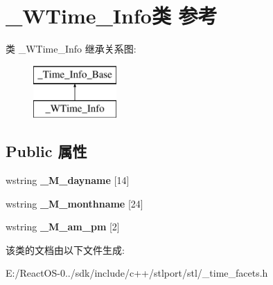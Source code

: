 \hypertarget{class___w_time___info}{}\section{\+\_\+\+W\+Time\+\_\+\+Info类 参考}
\label{class___w_time___info}
类 \+\_\+\+W\+Time\+\_\+\+Info 继承关系图\+:\begin{figure}[H]
\begin{center}
\leavevmode
\includegraphics[height=2.000000cm]{class___w_time___info}
\end{center}
\end{figure}
\subsection*{Public 属性}
\begin{DoxyCompactItemize}
\item 
\mbox{\label{class___w_time___info_a647f1048353a46c41dee81b80a72613f}} 
wstring {\bfseries \+\_\+\+M\+\_\+dayname} \mbox{[}14\mbox{]}
\item 
\mbox{\label{class___w_time___info_a3d736ae180cb3e3978105caa4b9ebbb3}} 
wstring {\bfseries \+\_\+\+M\+\_\+monthname} \mbox{[}24\mbox{]}
\item 
\mbox{\label{class___w_time___info_aa422fc529e1081fb736e5d991c059943}} 
wstring {\bfseries \+\_\+\+M\+\_\+am\+\_\+pm} \mbox{[}2\mbox{]}
\end{DoxyCompactItemize}


该类的文档由以下文件生成\+:\begin{DoxyCompactItemize}
\item 
E\+:/\+React\+O\+S-\/0../sdk/include/c++/stlport/stl/\+\_\+time\+\_\+facets.\+h\end{DoxyCompactItemize}
